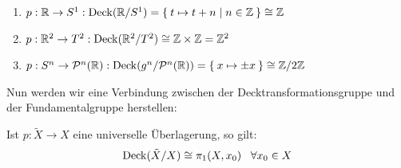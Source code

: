 \begin{beispiel}
    \begin{enumerate}[label=\arabic*)]
        \item $p: \mathbb{R} \rightarrow S^1: \operatorname{Deck}(\mathbb{R} / S^1) = \Set{t \mapsto t + n | n \in \ensuremath{\mathbb{Z}}} \cong \mathbb{Z}$
        \item $p: \mathbb{R}^2 \rightarrow T^2: \operatorname{Deck}(\mathbb{R}^2 / T^2) \cong \mathbb{Z} \times \mathbb{Z} = \mathbb{Z}^2$
        \item $p: S^n \rightarrow \mathcal{P}^n(\mathbb{R}): \operatorname{Deck}(g^n / \mathcal{P}^n(\mathbb{R})) = \Set{x \mapsto \pm x} \cong \mathbb{Z} / 2 \mathbb{Z}$
    \end{enumerate}
\end{beispiel}

Nun werden wir eine Verbindung zwischen der Decktransformationsgruppe
und der Fundamentalgruppe herstellen:

\begin{satz}\label{thm:12.15}%
    Ist $p: \tilde{X} \rightarrow X$ eine universelle Überlagerung, 
    so gilt:
    \[\operatorname{Deck}(\tilde{X}/X) \cong \pi_1(X, x_0)\;\;\;\forall x_0 \in X\]
\end{satz}

